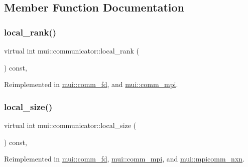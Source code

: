 \subsection{Member Function Documentation}
\mbox{\label{classmui_1_1communicator_a83311811022225d758dd86866e620466}} 
\subsubsection{\texorpdfstring{local\+\_\+rank()}{local\_rank()}}
{\footnotesize\ttfamily virtual int mui\+::communicator\+::local\+\_\+rank (\begin{DoxyParamCaption}{ }\end{DoxyParamCaption}) const\hspace{0.3cm}{\ttfamily [inline]}, {\ttfamily [virtual]}}



Reimplemented in \hyperlink{classmui_1_1comm__fd_ae149073567b5f9997fa3f4bd5fae0336}{mui\+::comm\+\_\+fd}, and \hyperlink{classmui_1_1comm__mpi_ab0cf03ad7dbe099e0859a920f2711709}{mui\+::comm\+\_\+mpi}.

\mbox{\label{classmui_1_1communicator_aa98faead0a9f63b8edb8b987477998e1}} 
\subsubsection{\texorpdfstring{local\+\_\+size()}{local\_size()}}
{\footnotesize\ttfamily virtual int mui\+::communicator\+::local\+\_\+size (\begin{DoxyParamCaption}{ }\end{DoxyParamCaption}) const\hspace{0.3cm}{\ttfamily [inline]}, {\ttfamily [virtual]}}



Reimplemented in \hyperlink{classmui_1_1comm__fd_a9c119bf4de88c8047488750deb2e78ef}{mui\+::comm\+\_\+fd}, \hyperlink{classmui_1_1comm__mpi_a580ce0c15f414fe6d80efa74cefa2338}{mui\+::comm\+\_\+mpi}, and \hyperlink{classmui_1_1mpicomm__nxn_aa30777638394ee6f17851f06c7793454}{mui\+::mpicomm\+\_\+nxn}.

